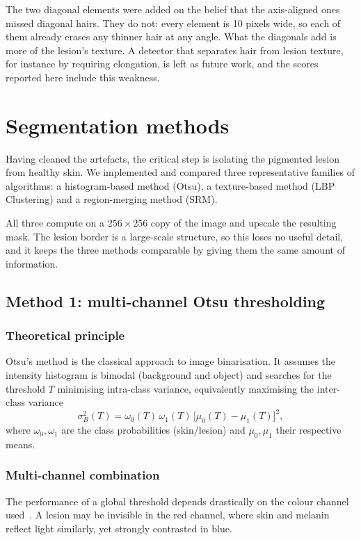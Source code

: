 \documentclass[11pt,a4paper]{article}
\begin{document}
The two diagonal elements were added on the belief that the axis-aligned
ones missed diagonal hairs. They do not: every element is 10 pixels wide, so
each of them already erases any thinner hair at any angle. What the diagonals
add is more of the lesion's texture. A detector that separates hair from
lesion texture, for instance by requiring elongation, is left as future work,
and the scores reported here include this weakness.

\section{Segmentation methods}

Having cleaned the artefacts, the critical step is isolating the pigmented
lesion from healthy skin. We implemented and compared three representative
families of algorithms: a histogram-based method (Otsu), a texture-based method
(LBP Clustering) and a region-merging method (SRM).

All three compute on a $256 \times 256$ copy of the image and upscale the
resulting mask. The lesion border is a large-scale structure, so this loses no
useful detail, and it keeps the three methods comparable by giving them the same
amount of information.

\subsection{Method 1: multi-channel Otsu thresholding}
\label{sec:otsu}

\subsubsection{Theoretical principle}

Otsu's method is the classical approach to image binarisation. It assumes the
intensity histogram is bimodal (background and object) and searches for the
threshold $T$ minimising intra-class variance, equivalently maximising the
inter-class variance
\[
\sigma_B^2(T) = \omega_0(T)\,\omega_1(T)\,\bigl[\mu_0(T) - \mu_1(T)\bigr]^2,
\]
where $\omega_0, \omega_1$ are the class probabilities (skin/lesion) and
$\mu_0, \mu_1$ their respective means.

\subsubsection{Multi-channel combination}

The performance of a global threshold depends drastically on the colour channel
used~\cite{garnavi}. A lesion may be invisible in the red channel, where skin and
melanin reflect light similarly, yet strongly contrasted in blue.
\end{document}
